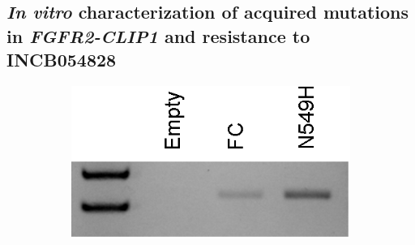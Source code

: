\subsection[In vitro characterization of acquired mutations in FGFR2-CLIP1 and resistance to INCB054828]{\textit{In vitro} characterization of acquired mutations in \textit{FGFR2-CLIP1} and resistance to INCB054828}
\begin{figure}[htbp]
    \begin{minipage}[t]{0.22\textwidth}
        \vspace{0pt}
        \begin{subfigure}{\textwidth}
            \includegraphics[width=\textwidth,keepaspectratio]{images/240/fusion_rtpcr}
            \caption{}\label{fig:240:fusion_rtpcr}
        \end{subfigure}\par\vspace{0.5cm}
        \begin{subfigure}{\textwidth}

\end{subfigure}
\end{minipage}
\end{figure}

